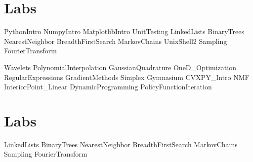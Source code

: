 \documentclass[opener-c,labs,red,nociteref]{HJnewsiambook}
\begin{document}
\mainmatter %

\ifbyu

\part{Labs} %
{PythonIntro}
{NumpyIntro}
{MatplotlibIntro}
{UnitTesting}
{LinkedLists}
{BinaryTrees}
{NearestNeighbor}
{BreadthFirstSearch}
{MarkovChains}
{UnixShell2}
{Sampling}
{FourierTransform}

{Wavelets}
{PolynomialInterpolation}
{GaussianQuadrature}
{OneD_Optimization}
{RegularExpressions}
{GradientMethods}
{Simplex}
{Gymnasium}
{CVXPY_Intro}
{NMF}
{InteriorPoint_Linear}
{DynamicProgramming}
{PolicyFunctionIteration}

\else 

\part{Labs} %
{LinkedLists}
{BinaryTrees}
{NearestNeighbor}
{BreadthFirstSearch}
{MarkovChains}
{Sampling}
{FourierTransform}
\end{document}
